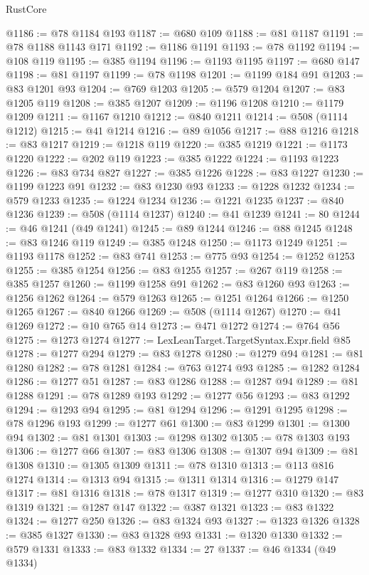 \begin{lexlean}{RustCore}
\begin{coremodule}
@1186 := @78 @1184 @193
@1187 := @680 @109
@1188 := @81 @1187
@1191 := @78 @1188 @1143 @171
@1192 := @1186 @1191
@1193 := @78 @1192
@1194 := @108 @119
@1195 := @385 @1194
@1196 := @1193 @1195
@1197 := @680 @147
@1198 := @81 @1197
@1199 := @78 @1198
@1201 := @1199 @184 @91
@1203 := @83 @1201 @93
@1204 := @769 @1203
@1205 := @579 @1204
@1207 := @83 @1205 @119
@1208 := @385 @1207
@1209 := @1196 @1208
@1210 := @1179 @1209
@1211 := @1167 @1210
@1212 := @840 @1211
@1214 := @508 (@1114 @1212)
@1215 := @41 @1214
@1216 := @89 @1056
@1217 := @88 @1216
@1218 := @83 @1217
@1219 := @1218 @119
@1220 := @385 @1219
@1221 := @1173 @1220
@1222 := @202 @119
@1223 := @385 @1222
@1224 := @1193 @1223
@1226 := @83 @734 @827
@1227 := @385 @1226
@1228 := @83 @1227
@1230 := @1199 @1223 @91
@1232 := @83 @1230 @93
@1233 := @1228 @1232
@1234 := @579 @1233
@1235 := @1224 @1234
@1236 := @1221 @1235
@1237 := @840 @1236
@1239 := @508 (@1114 @1237)
@1240 := @41 @1239
@1241 := 80
@1244 := @46 @1241 (@49 @1241)
@1245 := @89 @1244
@1246 := @88 @1245
@1248 := @83 @1246 @119
@1249 := @385 @1248
@1250 := @1173 @1249
@1251 := @1193 @1178
@1252 := @83 @741
@1253 := @775 @93
@1254 := @1252 @1253
@1255 := @385 @1254
@1256 := @83 @1255
@1257 := @267 @119
@1258 := @385 @1257
@1260 := @1199 @1258 @91
@1262 := @83 @1260 @93
@1263 := @1256 @1262
@1264 := @579 @1263
@1265 := @1251 @1264
@1266 := @1250 @1265
@1267 := @840 @1266
@1269 := @508 (@1114 @1267)
@1270 := @41 @1269
@1272 := @10 @765 @14
@1273 := @471 @1272
@1274 := @764 @56
@1275 := @1273 @1274
@1277 := LexLeanTarget.TargetSyntax.Expr.field @85
@1278 := @1277 @294
@1279 := @83 @1278
@1280 := @1279 @94
@1281 := @81 @1280
@1282 := @78 @1281
@1284 := @763 @1274 @93
@1285 := @1282 @1284
@1286 := @1277 @51
@1287 := @83 @1286
@1288 := @1287 @94
@1289 := @81 @1288
@1291 := @78 @1289 @193
@1292 := @1277 @56
@1293 := @83 @1292
@1294 := @1293 @94
@1295 := @81 @1294
@1296 := @1291 @1295
@1298 := @78 @1296 @193
@1299 := @1277 @61
@1300 := @83 @1299
@1301 := @1300 @94
@1302 := @81 @1301
@1303 := @1298 @1302
@1305 := @78 @1303 @193
@1306 := @1277 @66
@1307 := @83 @1306
@1308 := @1307 @94
@1309 := @81 @1308
@1310 := @1305 @1309
@1311 := @78 @1310
@1313 := @113 @816 @1274
@1314 := @1313 @94
@1315 := @1311 @1314
@1316 := @1279 @147
@1317 := @81 @1316
@1318 := @78 @1317
@1319 := @1277 @310
@1320 := @83 @1319
@1321 := @1287 @147
@1322 := @387 @1321
@1323 := @83 @1322
@1324 := @1277 @250
@1326 := @83 @1324 @93
@1327 := @1323 @1326
@1328 := @385 @1327
@1330 := @83 @1328 @93
@1331 := @1320 @1330
@1332 := @579 @1331
@1333 := @83 @1332
@1334 := 27
@1337 := @46 @1334 (@49 @1334)

\end{coremodule}
\end{lexlean}
